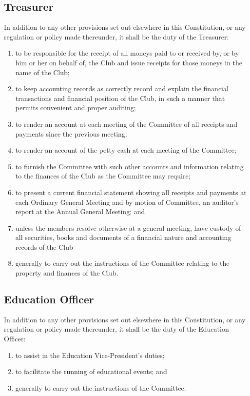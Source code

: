 \documentclass[11pt]{article} %
\begin{document}
\subsection{Treasurer}
In addition to any other provisions set out elsewhere in this Constitution, or any regulation or policy made thereunder, it shall be the duty of the Treasurer:
\begin{enumerate}
	\item to be responsible for the receipt of all moneys paid to or received by, or by him or her on behalf of, the Club and issue receipts for those moneys in the name of the Club;
	\item to keep accounting records as correctly record and explain the financial transactions and financial position of the Club, in such a manner that permits convenient and proper auditing;
	\item to render an account at each meeting of the Committee of all receipts and payments since the previous meeting;
	\item to render an account of the petty cash at each meeting of the Committee;
	\item to furnish the Committee with such other accounts and information relating to the finances of the Club as the Committee may require;
	\item to present a current financial statement showing all receipts and payments at each Ordinary General Meeting and by motion of Committee, an auditor's report at the Annual General Meeting; and
	\item unless the members resolve otherwise at a general meeting, have custody of all securities, books and documents of a financial nature and accounting records of the Club
	\item generally to carry out the instructions of the Committee relating to the property and finances of the Club.
\end{enumerate}

{\color{ForestGreen} \subsection{Education Officer}
In addition to any other provisions set out elsewhere in this Constitution, or any regulation or policy made thereunder, it shall be the duty of the Education Officer:
\begin{enumerate}
	\item to assist in the Education Vice-President's duties;
	\item to facilitate the running of educational events; and
	\item generally to carry out the instructions of the Committee.
\end{enumerate}}
\end{document}
